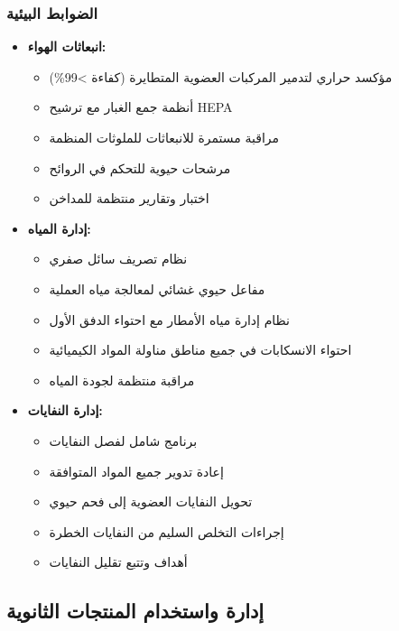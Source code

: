 \subsubsection{الضوابط البيئية}
\begin{itemize}
    \item \textbf{انبعاثات الهواء:}
    \begin{itemize}
        \item مؤكسد حراري لتدمير المركبات العضوية المتطايرة (كفاءة >99\%)
        \item أنظمة جمع الغبار مع ترشيح HEPA
        \item مراقبة مستمرة للانبعاثات للملوثات المنظمة
        \item مرشحات حيوية للتحكم في الروائح
        \item اختبار وتقارير منتظمة للمداخن
    \end{itemize}
    
    \item \textbf{إدارة المياه:}
    \begin{itemize}
        \item نظام تصريف سائل صفري
        \item مفاعل حيوي غشائي لمعالجة مياه العملية
        \item نظام إدارة مياه الأمطار مع احتواء الدفق الأول
        \item احتواء الانسكابات في جميع مناطق مناولة المواد الكيميائية
        \item مراقبة منتظمة لجودة المياه
    \end{itemize}
    
    \item \textbf{إدارة النفايات:}
    \begin{itemize}
        \item برنامج شامل لفصل النفايات
        \item إعادة تدوير جميع المواد المتوافقة
        \item تحويل النفايات العضوية إلى فحم حيوي
        \item إجراءات التخلص السليم من النفايات الخطرة
        \item أهداف وتتبع تقليل النفايات
    \end{itemize}
\end{itemize}

\subsection{إدارة واستخدام المنتجات الثانوية}
\label{sec:byproduct_management}


